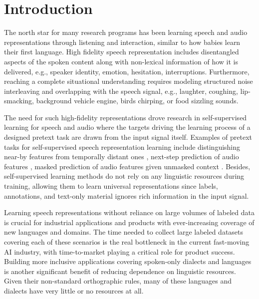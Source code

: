 \section{Introduction}
\label{sec:intro}
The north star for many research programs has been learning speech and audio representations through listening and interaction, similar to how babies learn their first language. High fidelity speech representation includes disentangled aspects of the spoken content along with non-lexical information of how it is delivered, e.g., speaker identity, emotion, hesitation, interruptions. Furthermore, reaching a complete situational understanding requires modeling structured noise interleaving and overlapping with the speech signal, e.g., laughter, coughing, lip-smacking, background vehicle engine, birds chirping, or food sizzling sounds.

The need for such high-fidelity representations drove research in self-supervised learning for speech and audio where the targets driving the learning process of a designed pretext task are drawn from the input signal itself. Examples of pretext tasks for self-supervised speech representation learning include distinguishing near-by features from temporally distant ones \cite{oord2018representation,schneider2019wav2vec,kharitonov2020data}, next-step prediction of audio features \cite{chung2019unsupervised}, masked prediction of audio features given unmasked context \cite{baevski2019vq,baevski2020wav2vec}. Besides, self-supervised learning methods do not rely on any linguistic resources during training, allowing them to learn universal representations since labels, annotations, and text-only material ignores rich information in the input signal.

Learning speech representations without reliance on large volumes of labeled data is crucial for industrial applications and products with ever-increasing coverage of new languages and domains. The time needed to collect large labeled datasets covering each of these scenarios is the real bottleneck in the current fast-moving AI industry, with time-to-market playing a critical role for product success. Building more inclusive applications covering spoken-only dialects and languages is another significant benefit of reducing dependence on linguistic resources. Given their non-standard orthographic rules, many of these languages and dialects have very little or no resources at all.

